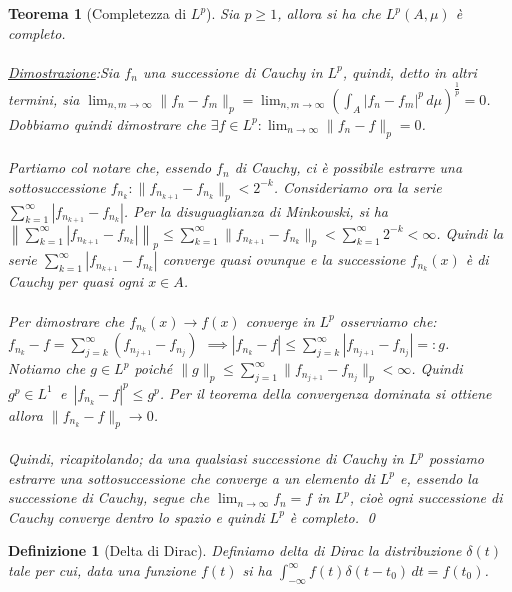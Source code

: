 \documentclass[a4paper,12pt]{report}
\newtheorem{teorema}{Teorema}[chapter]
\newtheorem{definizione}{Definizione}[chapter]
\newcommand{\lt}{<}
\begin{document}
\begin{teorema}[Completezza di $L^p$]\label{app: .13}
    Sia $p\geq 1$, allora si ha che $L^p(A,\mu)$ è completo.
    \\
    \\ \underline{Dimostrazione}:Sia $f_n$ una successione di Cauchy in $L^p$, quindi, detto in altri termini, sia $\displaystyle\lim_{n,m\to\infty}\|f_n-f_m\|_p=\lim_{n,m\to\infty}\left(\int_A|f_n-f_m|^p\,d\mu\right)^{\frac{1}{p}}=0$. Dobbiamo quindi dimostrare che $\exists f\in L^p : \displaystyle\lim_{n\to\infty}\|f_n-f\|_p=0$.
\\
\\Partiamo col notare che, essendo $f_n$ di Cauchy, ci è possibile estrarre una sottosuccessione $f_{n_k}: \|f_{n_{k+1}}-f_{n_k}\|_p\lt 2^{-k}$. Consideriamo ora la serie $\displaystyle \sum_{k=1}^\infty |f_{n_{k+1}}-f_{n_k}|$. Per la disuguaglianza di Minkowski, si ha $\left\|\sum_{k=1}^\infty |f_{n_{k+1}}-f_{n_k}|\right\|_p \leq \sum_{k=1}^\infty \|f_{n_{k+1}}-f_{n_k}\|_p \lt \sum_{k=1}^\infty 2^{-k} \lt \infty$. Quindi la serie $\displaystyle \sum_{k=1}^\infty |f_{n_{k+1}}-f_{n_k}|$ converge quasi ovunque e la successione $f_{n_k}(x)$ è di Cauchy per quasi ogni $x\in A$.
\\
\\ Per dimostrare che $f_{n_k}(x)\to f(x)$ converge in $L^p$ osserviamo che:
\\ \mbox{$f_{n_k}-f=\displaystyle\sum_{j=k}^\infty (f_{n_{j+1}}-f_{n_j})$} $ \implies |f_{n_k}-f|\leq \displaystyle\sum_{j=k}^\infty |f_{n_{j+1}}-f_{n_j}|=:g$.
\\Notiamo che $g\in L^p$ poiché $\|g\|_p \leq \sum_{j=1}^\infty \|f_{n_{j+1}}-f_{n_j}\|_p \lt \infty$. \mbox{Quindi $g^p\in L^1$ e $|f_{n_k}-f|^p \leq g^p$.} Per il teorema della convergenza dominata si ottiene allora $\|f_{n_k}-f\|_p \to 0$.
\\
\\Quindi, ricapitolando; da una qualsiasi successione di Cauchy in $L^p$ possiamo estrarre una sottosuccessione che converge a un elemento di $L^p$ e, essendo la successione di Cauchy, segue che $\displaystyle\lim_{n\to\infty}f_n=f$ in $L^p$, cioè ogni successione di Cauchy converge dentro lo spazio e quindi $L^p$ è completo. \qed
\end{teorema}

\begin{definizione}[Delta di Dirac]\label{app: .31}
    Definiamo delta di Dirac la distribuzione $\delta(t)$ tale per cui, data una funzione $f(t)$ si ha $\displaystyle\int_{-\infty}^\infty f(t)\delta(t-t_0) \,dt=f(t_0)$.
\end{definizione}
\end{document}
